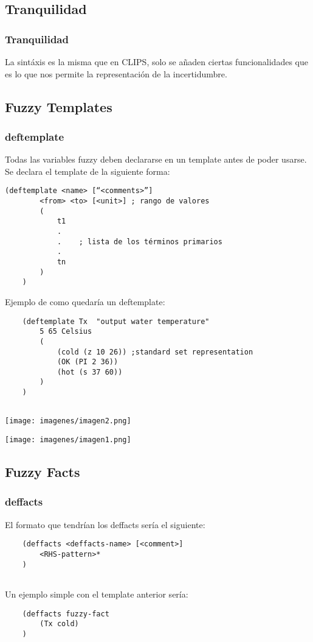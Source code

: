 \documentclass{beamer}
\begin{document}
\subsection{Tranquilidad}
\begin{frame}
\frametitle{Tranquilidad}
La sintáxis es la misma que en CLIPS, solo se añaden ciertas funcionalidades que es lo que nos permite la representación de la incertidumbre.
\end{frame}

\subsection{Fuzzy Templates}

\begin{frame}[fragile]
	\frametitle{deftemplate}
	Todas las variables fuzzy deben declararse en un template antes de poder usarse. Se declara el template de la siguiente forma:
	\begin{Verbatim}[tabsize=8,fontsize=\footnotesize]
	(deftemplate <name> [“<comments>”]
	    <from> <to> [<unit>] ; rango de valores
	    (
	        t1
	        .
	        .    ; lista de los términos primarios
	        .    
         	tn
	    )
	)
	\end{Verbatim}

\end{frame}
\begin{frame}[fragile]
	Ejemplo de como quedaría un deftemplate:
	\begin{verbatim}
	(deftemplate Tx  "output water temperature"
	    5 65 Celsius
	    (
	        (cold (z 10 26)) ;standard set representation
	        (OK (PI 2 36))
	        (hot (s 37 60))
	    )
	)
	
	\end{verbatim}
\end{frame}
\begin{frame}
	\texttt{[image: imagenes/imagen2.png]}
\end{frame}
\begin{frame}
	\texttt{[image: imagenes/imagen1.png]}
\end{frame}
\subsection{Fuzzy Facts}
\begin{frame}[fragile]
	\frametitle{deffacts}
	El formato que tendrían los deffacts sería el siguiente:
	\begin{verbatim}
	(deffacts <deffacts-name> [<comment>]
	    <RHS-pattern>*
	)
	
	\end{verbatim}
\end{frame}
\begin{frame}[fragile]
	Un ejemplo simple con el template anterior sería:
	\begin{verbatim}
	(deffacts fuzzy-fact
	    (Tx cold)
	)
	\end{verbatim}
\end{frame}
\end{document}
